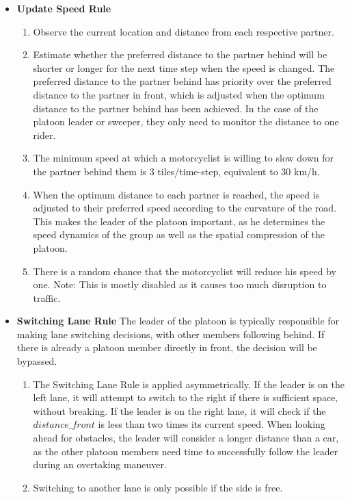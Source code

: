 \begin{itemize}
\begin{itemize}
        \item \textbf{Update Speed Rule}
         \begin{enumerate}
             \item Observe the current location and distance from each respective partner.
             \item Estimate whether the preferred distance to the partner behind will be shorter or longer for the next time step when the speed is changed. The preferred distance to the partner behind has priority over the preferred distance to the partner in front, which is adjusted when the optimum distance to the partner behind has been achieved. In the case of the platoon leader or sweeper, they only need to monitor the distance to one rider.
             \item The minimum speed at which a motorcyclist is willing to slow down for the partner behind them is 3 tiles/time-step, equivalent to 30 km/h.
             \item When the optimum distance to each partner is reached, the speed is adjusted to their preferred speed according to the curvature of the road. This makes the leader of the platoon important, as he determines the speed dynamics of the group as well as the spatial compression of the platoon. 
             \item There is a random chance that the motorcyclist will reduce his speed by one. Note: This is mostly disabled as it causes too much disruption to traffic. 
         \end{enumerate}
         \item \textbf{Switching Lane Rule}
         The leader of the platoon is typically responsible for making lane switching decisions, with other members following behind. If there is already a platoon member directly in front, the decision will be bypassed.
         \begin{enumerate}
         \item The Switching Lane Rule is applied asymmetrically. If the leader is on the left lane, it will attempt to switch to the right if there is sufficient space, without breaking. If the leader is on the right lane, it will check if the $distance\_front$ is less than two times its current speed. When looking ahead for obstacles, the leader will consider a longer distance than a car, as the other platoon members need time to successfully follow the leader during an overtaking maneuver.
         \item Switching to another lane is only possible if the side is free. 

\end{enumerate}
\end{itemize}
\end{itemize}
